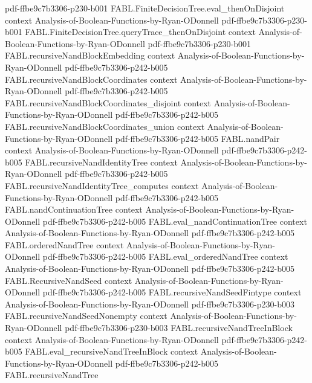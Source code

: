 \begin{theorem}
  {pdf-ffbe9c7b3306-p230-b001}
\proofstep
  {FABL.FiniteDecisionTree.eval_thenOnDisjoint}
  {context}
  {Analysis-of-Boolean-Functions-by-Ryan-ODonnell}
  {pdf-ffbe9c7b3306-p230-b001}
\proofstep
  {FABL.FiniteDecisionTree.queryTrace_thenOnDisjoint}
  {context}
  {Analysis-of-Boolean-Functions-by-Ryan-ODonnell}
  {pdf-ffbe9c7b3306-p230-b001}
\proofstep
  {FABL.recursiveNandBlockEmbedding}
  {context}
  {Analysis-of-Boolean-Functions-by-Ryan-ODonnell}
  {pdf-ffbe9c7b3306-p242-b005}
\proofstep
  {FABL.recursiveNandBlockCoordinates}
  {context}
  {Analysis-of-Boolean-Functions-by-Ryan-ODonnell}
  {pdf-ffbe9c7b3306-p242-b005}
\proofstep
  {FABL.recursiveNandBlockCoordinates_disjoint}
  {context}
  {Analysis-of-Boolean-Functions-by-Ryan-ODonnell}
  {pdf-ffbe9c7b3306-p242-b005}
\proofstep
  {FABL.recursiveNandBlockCoordinates_union}
  {context}
  {Analysis-of-Boolean-Functions-by-Ryan-ODonnell}
  {pdf-ffbe9c7b3306-p242-b005}
\proofstep
  {FABL.nandPair}
  {context}
  {Analysis-of-Boolean-Functions-by-Ryan-ODonnell}
  {pdf-ffbe9c7b3306-p242-b005}
\proofstep
  {FABL.recursiveNandIdentityTree}
  {context}
  {Analysis-of-Boolean-Functions-by-Ryan-ODonnell}
  {pdf-ffbe9c7b3306-p242-b005}
\proofstep
  {FABL.recursiveNandIdentityTree_computes}
  {context}
  {Analysis-of-Boolean-Functions-by-Ryan-ODonnell}
  {pdf-ffbe9c7b3306-p242-b005}
\proofstep
  {FABL.nandContinuationTree}
  {context}
  {Analysis-of-Boolean-Functions-by-Ryan-ODonnell}
  {pdf-ffbe9c7b3306-p242-b005}
\proofstep
  {FABL.eval_nandContinuationTree}
  {context}
  {Analysis-of-Boolean-Functions-by-Ryan-ODonnell}
  {pdf-ffbe9c7b3306-p242-b005}
\proofstep
  {FABL.orderedNandTree}
  {context}
  {Analysis-of-Boolean-Functions-by-Ryan-ODonnell}
  {pdf-ffbe9c7b3306-p242-b005}
\proofstep
  {FABL.eval_orderedNandTree}
  {context}
  {Analysis-of-Boolean-Functions-by-Ryan-ODonnell}
  {pdf-ffbe9c7b3306-p242-b005}
\proofstep
  {FABL.RecursiveNandSeed}
  {context}
  {Analysis-of-Boolean-Functions-by-Ryan-ODonnell}
  {pdf-ffbe9c7b3306-p242-b005}
\proofstep
  {FABL.recursiveNandSeedFintype}
  {context}
  {Analysis-of-Boolean-Functions-by-Ryan-ODonnell}
  {pdf-ffbe9c7b3306-p230-b003}
\proofstep
  {FABL.recursiveNandSeedNonempty}
  {context}
  {Analysis-of-Boolean-Functions-by-Ryan-ODonnell}
  {pdf-ffbe9c7b3306-p230-b003}
\proofstep
  {FABL.recursiveNandTreeInBlock}
  {context}
  {Analysis-of-Boolean-Functions-by-Ryan-ODonnell}
  {pdf-ffbe9c7b3306-p242-b005}
\proofstep
  {FABL.eval_recursiveNandTreeInBlock}
  {context}
  {Analysis-of-Boolean-Functions-by-Ryan-ODonnell}
  {pdf-ffbe9c7b3306-p242-b005}
\proofstep
  {FABL.recursiveNandTree}

\end{theorem}
